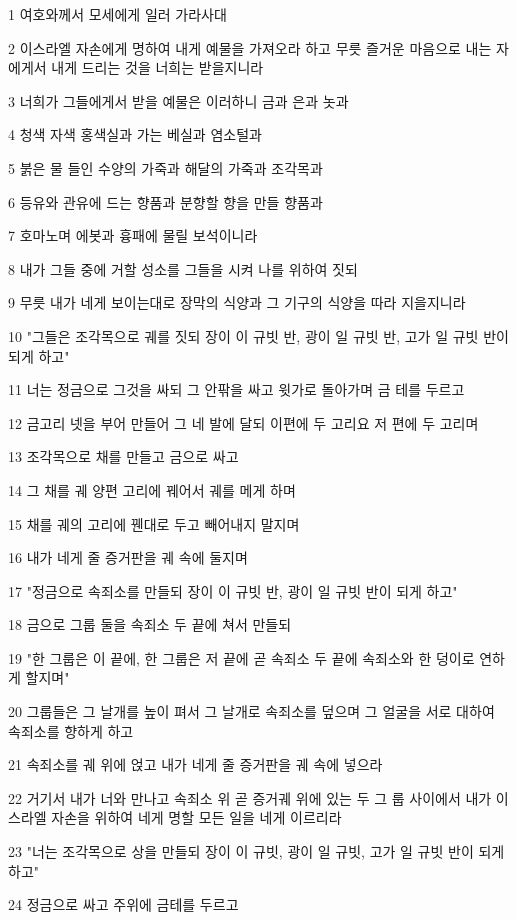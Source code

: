 \par 1 여호와께서 모세에게 일러 가라사대
\par 2 이스라엘 자손에게 명하여 내게 예물을 가져오라 하고 무릇 즐거운 마음으로 내는 자에게서 내게 드리는 것을 너희는 받을지니라
\par 3 너희가 그들에게서 받을 예물은 이러하니 금과 은과 놋과
\par 4 청색 자색 홍색실과 가는 베실과 염소털과
\par 5 붉은 물 들인 수양의 가죽과 해달의 가죽과 조각목과
\par 6 등유와 관유에 드는 향품과 분향할 향을 만들 향품과
\par 7 호마노며 에봇과 흉패에 물릴 보석이니라
\par 8 내가 그들 중에 거할 성소를 그들을 시켜 나를 위하여 짓되
\par 9 무릇 내가 네게 보이는대로 장막의 식양과 그 기구의 식양을 따라 지을지니라
\par 10 "그들은 조각목으로 궤를 짓되 장이 이 규빗 반, 광이 일 규빗 반, 고가 일 규빗 반이 되게 하고"
\par 11 너는 정금으로 그것을 싸되 그 안팎을 싸고 윗가로 돌아가며 금 테를 두르고
\par 12 금고리 넷을 부어 만들어 그 네 발에 달되 이편에 두 고리요 저 편에 두 고리며
\par 13 조각목으로 채를 만들고 금으로 싸고
\par 14 그 채를 궤 양편 고리에 꿰어서 궤를 메게 하며
\par 15 채를 궤의 고리에 꿴대로 두고 빼어내지 말지며
\par 16 내가 네게 줄 증거판을 궤 속에 둘지며
\par 17 "정금으로 속죄소를 만들되 장이 이 규빗 반, 광이 일 규빗 반이 되게 하고"
\par 18 금으로 그룹 둘을 속죄소 두 끝에 쳐서 만들되
\par 19 "한 그룹은 이 끝에, 한 그룹은 저 끝에 곧 속죄소 두 끝에 속죄소와 한 덩이로 연하게 할지며"
\par 20 그룹들은 그 날개를 높이 펴서 그 날개로 속죄소를 덮으며 그 얼굴을 서로 대하여 속죄소를 향하게 하고
\par 21 속죄소를 궤 위에 얹고 내가 네게 줄 증거판을 궤 속에 넣으라
\par 22 거기서 내가 너와 만나고 속죄소 위 곧 증거궤 위에 있는 두 그 룹 사이에서 내가 이스라엘 자손을 위하여 네게 명할 모든 일을 네게 이르리라
\par 23 "너는 조각목으로 상을 만들되 장이 이 규빗, 광이 일 규빗, 고가 일 규빗 반이 되게 하고"
\par 24 정금으로 싸고 주위에 금테를 두르고

